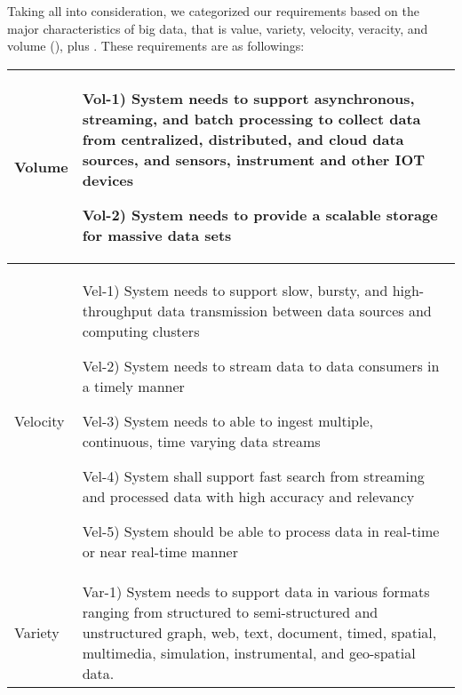 \documentclass[conference]{IEEEtran}
\begin{document}
Taking all into consideration, we categorized our requirements based on the major characteristics of big data, that is value, variety, velocity, veracity, and volume (\cite{ataei}), plus  . These requirements are as followings: 

\newcommand\rownumber{\stepcounter{magicrownumbers}\arabic{magicrownumbers}}

\begin{center}
    \begin{table*}
    \renewcommand*{\arraystretch}{1.8}
    \begin{tabular}{ | m{1.2cm} | m{14cm} |}

        \hline

        Volume &

        Vol-1) System needs to support asynchronous, streaming, and batch processing to collect data from centralized, distributed, and cloud data sources, and sensors, instrument and other IOT devices 
        
        Vol-2) System needs to provide a scalable storage for massive data sets 
 
        \\

        \hline

        Velocity & 
        
        Vel-1) System needs to support slow, bursty, and high-throughput data transmission between data sources and computing clusters
        
        Vel-2) System needs to stream data to data consumers in a timely manner 

        Vel-3) System needs to able to ingest multiple, continuous, time varying data streams 

        Vel-4) System shall support fast search from streaming and processed data with high accuracy and relevancy 
        
        Vel-5) System should be able to process data in real-time or near real-time manner 
    
        \\ 

        \hline

        Variety & 

        Var-1) System needs to support data in various formats ranging from structured to semi-structured and unstructured graph, web, text, document, timed, spatial, multimedia, simulation, instrumental, and geo-spatial data. 


\end{tabular}
\end{table*}
\end{center}
\end{document}
